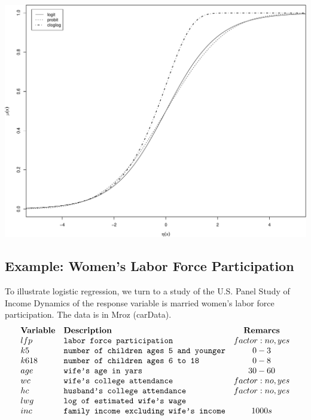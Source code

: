 \documentclass[
]{article}
\begin{document}
\includegraphics{LogisticRegressCh6_files/figure-latex/unnamed-chunk-2-1.pdf}

\hypertarget{example-womens-labor-force-participation}{%
\subsection{Example: Women's Labor Force
Participation}\label{example-womens-labor-force-participation}}

To illustrate logistic regression, we turn to a study of the U.S. Panel
Study of Income Dynamics of the response variable is married women's
labor force participation. The data is in Mroz (carData).
\[\begin{array}{llc}
  \bf{Variable} & {\bf Description} & {\bf Remarcs} \\
  lfp & \verb+labor force participation+ & factor: no, yes \\
  k5 & \verb+number of children ages 5 and younger+ & 0-3 \\
  k618 & \verb+number of children ages 6 to 18+ & 0-8\\
  age & \verb+wife's age in yars+ & 30-60 \\
  wc & \verb+wife's college attendance+ & factor: no, yes \\
  hc & \verb+husband's college attendance+ & factor: no, yes \\
  lwg & \verb+log of estimated wife's wage+ &  \\
  inc & \verb+family income excluding wife's income+ & 1000s
\end{array} \]
\end{document}
